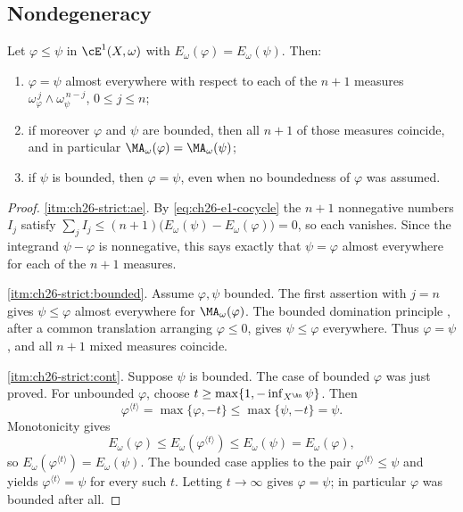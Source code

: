 \subsection{Nondegeneracy}
\label{sec:ch26-gauge-nondegenerate}

\begin{proposition}
\label{prop:ch26-strict-monotone}
Let $\varphi\leq\psi$ in $\cE^1(X,\omega)$ with
$E_\omega(\varphi)=E_\omega(\psi)$.  Then:
\begin{enumerate}
\item\label{itm:ch26-strict:ae}
 $\varphi=\psi$ almost everywhere with respect to each of the $n+1$
 measures $\omega_\varphi^{\,j}\wedge\omega_\psi^{\,n-j}$,
 $0\leq j\leq n$;
\item\label{itm:ch26-strict:bounded}
 if moreover $\varphi$ and $\psi$ are bounded, then all $n+1$ of those
 measures coincide, and in particular
 $\MA_\omega(\varphi)=\MA_\omega(\psi)$;
\item\label{itm:ch26-strict:cont}
 if $\psi$ is bounded, then $\varphi=\psi$, even when no boundedness
 of $\varphi$ was assumed.
\end{enumerate}
\end{proposition}

\begin{proof}
\cref{itm:ch26-strict:ae}.  By \eqref{eq:ch26-e1-cocycle} the $n+1$
nonnegative numbers $I_j$ satisfy
$\sum_jI_j\leq(n+1)\bigl(E_\omega(\psi)-E_\omega(\varphi)\bigr)=0$, so each
vanishes.  Since the integrand $\psi-\varphi$ is nonnegative, this says
exactly that $\psi=\varphi$ almost everywhere for each of the $n+1$
measures.

\cref{itm:ch26-strict:bounded}.  Assume $\varphi,\psi$ bounded.
The first assertion with $j=n$ gives $\psi\leq\varphi$ almost everywhere
for $\MA_\omega(\varphi)$.  The bounded domination principle
, after a common translation
arranging $\varphi\leq0$, gives $\psi\leq\varphi$ everywhere.
Thus $\varphi=\psi$, and all $n+1$ mixed measures coincide.

\cref{itm:ch26-strict:cont}.  Suppose $\psi$ is bounded.
The case of bounded $\varphi$ was just proved.
For unbounded $\varphi$, choose $t\geq\max\{1,-\inf_{X^{\An}}\psi\}$.  Then
\[
 \varphi^{\langle t\rangle}=\max\{\varphi,-t\}
 \leq\max\{\psi,-t\}=\psi .
\]
Monotonicity gives
\[
 E_\omega(\varphi)\leq E_\omega(\varphi^{\langle t\rangle})
 \leq E_\omega(\psi)=E_\omega(\varphi),
\]
so $E_\omega(\varphi^{\langle t\rangle})=E_\omega(\psi)$.  The bounded case
applies to the pair $\varphi^{\langle t\rangle}\leq\psi$ and yields
$\varphi^{\langle t\rangle}=\psi$ for every such $t$.  Letting
$t\to\infty$ gives $\varphi=\psi$; in particular $\varphi$ was bounded
after all.
\end{proof}

